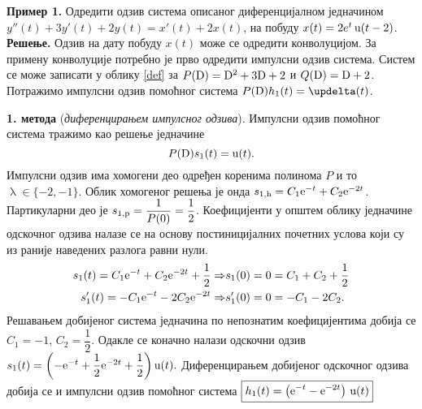 \vspace*{10mm}



\noindent\textbf{Пример 1.} Одредити одзив система 
описаног диференцијалном једначином 
$y''(t) + 3 y'(t) + 2y(t) = x'(t) + 2x(t) $, 
на побуду $x(t) = 2e^t\,{\rm u}(t-2)$. \\[1mm]
%

\noindent\textbf{Решење.} Одзив на дату побуду $x(t)$
може се одредити конволуцијом. За примену конволуције
потребно је прво одредити импулсни одзив система. 
Систем се може записати у облику \eqref{def} за
$P({\rm D}) = {\rm D}^2 + 3 {\rm D} + 2$ и 
$Q({\rm D}) = {\rm D} + 2$. Потражимо импулсни одзив
помоћног система $P({\rm D}) h_1(t) = \updelta(t)$.

\vspace*{2mm}
\noindent
\textbf{1. метода} (\textit{диференцирањем импулсног 
одзива}). Импулсни одзив помоћног система 
тражимо као решење једначине 
\begin{equation}
P({\rm D}) s_1(t) = {\rm u}(t).
\label{eq:step}
\end{equation} Импулсни одзив
има хомогени део одређен коренима полинома $P$ и то 
$\uplambda \in \{-2, -1\}$. Облик хомогеног решења 
је онда $s_{\rm 1,h} = C_1 {\rm e}^{-t} + C_2
{\rm e}^{-2t}$. Партикуларни део је 
$s_{\rm 1,p} = \dfrac{1}{P(0)} = \dfrac{1}{2}$. 
Коефицијенти у општем облику једначине одскочног одзива
налазе се на основу постиницијалних почетних услова 
који су из раније наведених разлога равни нули. 
\begin{eqnarray}
s_1(t) = C_1 {\rm e}^{-t} + C_2
{\rm e}^{-2t} + \dfrac{1}{2} \Rightarrow &
s_1(0) = 0 = C_1 + C_2 + \dfrac{1}{2} \\
s_1'(t) = -C_1 {\rm e}^{-t} - 2 C_2
{\rm e}^{-2t}  \Rightarrow &
s_1'(0) = 0 = -C_1 -2 C_2 .
\end{eqnarray}
Решавањем добијеног система једначина по 
непознатим коефицијентима добија се 
$C_1 = -1$, $C_2 = \dfrac{1}{2}$. Одакле се 
коначно налази одскочни одзив 
$
s_1(t) = 
\left(	
-{\rm e}^{-t} + \dfrac{1}{2}{\rm e}^{-2t} + 
\dfrac{1}{2} \right) {\rm u}(t).
$ 
Диференцирањем добијеног одскочног одзива 
добија се и импулсни одзив помоћног система
$
\boxed{
h_1(t) =
\left(
{\rm e}^{-t}  - {\rm e}^{-2t} 
\right) \, {\rm u}(t)
}
$

